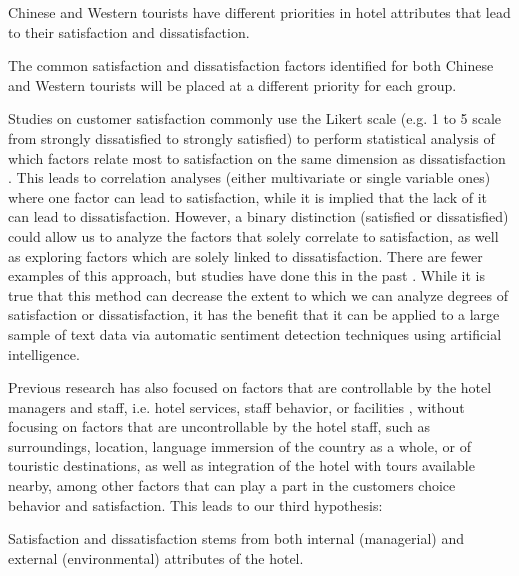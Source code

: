 \begin{hyp}
\label{hyp:1}
Chinese and Western tourists have different priorities in hotel attributes that lead to their satisfaction and dissatisfaction.
\end{hyp}

\begin{hyp}
\label{hyp:2}
The common satisfaction and dissatisfaction factors identified for both Chinese and Western tourists will be placed at a different priority for each group.
\end{hyp}

Studies on customer satisfaction \cite[e.g.][]{truong2009, romao2014, wu2009} commonly use the Likert scale \cite[][]{likert1932technique} (e.g. 1 to 5 scale from strongly dissatisfied to strongly satisfied) to perform statistical analysis of which factors relate most to satisfaction on the same dimension as dissatisfaction \cite[e.g.][]{chan201518, choi2000}. This leads to correlation analyses (either multivariate or single variable ones) where one factor can lead to satisfaction, while it is implied that the lack of it can lead to dissatisfaction. However, a binary distinction (satisfied or dissatisfied) could allow us to analyze the factors that solely correlate to satisfaction, as well as exploring factors which are solely linked to dissatisfaction. There are fewer examples of this approach, but studies have done this in the past \cite[e.g.][]{zhou2014}. While it is true that this method can decrease the extent to which we can analyze degrees of satisfaction or dissatisfaction, it has the benefit that it can be applied to a large sample of text data via automatic sentiment detection techniques using artificial intelligence. 

Previous research has also focused on factors that are controllable by the hotel managers and staff, i.e. hotel services, staff behavior, or facilities \cite[e.g.][]{shanka2004, choi2001}, without focusing on factors that are uncontrollable by the hotel staff, such as surroundings, location, language immersion of the country as a whole, or of touristic destinations, as well as integration of the hotel with tours available nearby, among other factors that can play a part in the customers choice behavior and satisfaction. 
This leads to our third hypothesis:

\begin{hyp}
\label{hyp:3}
Satisfaction and dissatisfaction stems from both internal (managerial) and external (environmental) attributes of the hotel.
\end{hyp}


